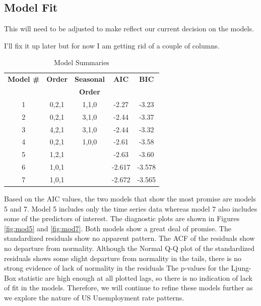 \documentclass[twoside,twocolumn]{article}
\begin{document}
      \subsection{Model Fit}
      
      This will need to be adjusted to make reflect our current decision on the models.
      
      I'll fix it up later but for now I am getting rid of a couple of columns.
  
     	\begin{table}[H]
     		\centering
     		\caption{Model Summaries}
     		     		\label{tab:models}
     		\begin{tabular}{ccccc}
     			\hline
     			\textbf{Model \#}  & \textbf{Order} & \textbf{Seasonal} &  \textbf{AIC} & \textbf{BIC} \\
     			&&\textbf{Order}&&\\ 
     			\hline
     			1   & 0,2,1 & 1,1,0 &  -2.27 & -3.23 \\ 
     			2   & 0,2,1 & 3,1,0 &  -2.44 & -3.37 \\ 
     			3   & 4,2,1 & 3,1,0 &  -2.44 & -3.32 \\ 
     			4  & 0,2,1 & 1,0,0 &  -2.61 & -3.58 \\ 
     			5  & 1,2,1 &  &  -2.63 & -3.60 \\ 
     			6  & 1,0,1 &  &  -2.617 &  -3.578 \\ 
     			7  & 1,0,1 & & -2.672 &  -3.565\\ \hline
     		\end{tabular}
     	\end{table}

		
		Based on the AIC values, the two models that show the most promise are models 5 and 7.  Model 5 includes only the time series data whereas model 7 also includes some of the predictors of interest.  The diagnostic plots are shown in Figures \ref{fig:mod5} and \ref{fig:mod7}. Both models show a great deal of promise.  The standardized residuals show no apparent pattern. The ACF of the residuals show no departure from normality. Although the Normal Q-Q plot of the standardized residuals shows some slight departure from normality in the tails, there is no strong evidence of lack of normality in the residuals  The p-values for the  Ljung-Box statistic are high enough at all plotted lags, so there is no indication of lack of fit in the models. Therefore, we will continue to refine these models further as we explore the nature of US Unemployment rate patterns.
\end{document}
